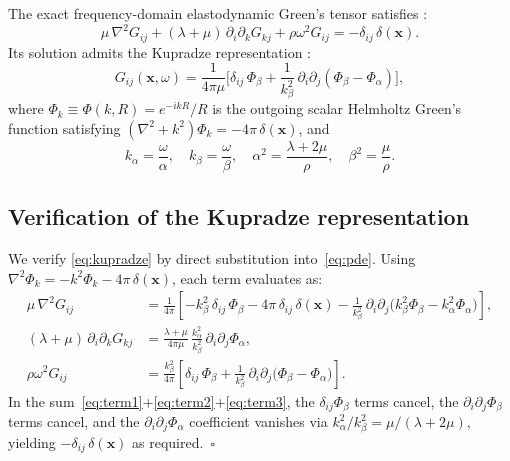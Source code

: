 \documentclass[11pt,a4paper]{article}
\newcommand{\bx}{\mathbf{x}}
\begin{document}
The exact frequency-domain elastodynamic Green's tensor satisfies
\citep{AkiRichards2002,BenMenahemSingh1981}:
\begin{equation}
  \mu\,\nabla^2 G_{ij}
  + (\lambda + \mu)\,\partial_i\partial_k G_{kj}
  + \rho\omega^2 G_{ij}
  = -\delta_{ij}\,\delta(\bx).
  \label{eq:pde}
\end{equation}
Its solution admits the Kupradze representation
\citep{Kupradze1963}:
\begin{equation}
  \boxed{
  G_{ij}(\bx,\omega)
  = \frac{1}{4\pi\mu}
    \biggl[
      \delta_{ij}\,\Phi_\beta
      + \frac{1}{k_\beta^2}\,
        \partial_i\partial_j\!\left(\Phi_\beta - \Phi_\alpha\right)
    \biggr],
  }
  \label{eq:kupradze}
\end{equation}
where
$\Phi_k \equiv \Phi(k,R) = e^{-ikR}/R$
is the outgoing scalar Helmholtz Green's function satisfying
$(\nabla^2 + k^2)\Phi_k = -4\pi\,\delta(\bx)$, and
\begin{equation}
  k_\alpha = \frac{\omega}{\alpha}, \quad
  k_\beta = \frac{\omega}{\beta}, \quad
  \alpha^2 = \frac{\lambda + 2\mu}{\rho}, \quad
  \beta^2 = \frac{\mu}{\rho}.
  \label{eq:wavenumbers}
\end{equation}

\subsection{Verification of the Kupradze representation}

We verify \eqref{eq:kupradze} by direct substitution into~\eqref{eq:pde}.
Using $\nabla^2\Phi_k = -k^2\Phi_k - 4\pi\,\delta(\bx)$, each term evaluates as:
\begin{align}
  \mu\,\nabla^2 G_{ij}
  &= \frac{1}{4\pi}\!\left[
       -k_\beta^2\,\delta_{ij}\,\Phi_\beta - 4\pi\,\delta_{ij}\,\delta(\bx)
       - \frac{1}{k_\beta^2}\,\partial_i\partial_j
         \bigl(k_\beta^2\Phi_\beta - k_\alpha^2\Phi_\alpha\bigr)
     \right], \label{eq:term1} \\[4pt]
  (\lambda\!+\!\mu)\,\partial_i\partial_k G_{kj}
  &= \frac{\lambda\!+\!\mu}{4\pi\mu}\,
     \frac{k_\alpha^2}{k_\beta^2}\,\partial_i\partial_j\Phi_\alpha,
     \label{eq:term2} \\[4pt]
  \rho\omega^2 G_{ij}
  &= \frac{k_\beta^2}{4\pi}\!\left[
       \delta_{ij}\,\Phi_\beta
       + \frac{1}{k_\beta^2}\,\partial_i\partial_j
         \bigl(\Phi_\beta - \Phi_\alpha\bigr)
     \right]. \label{eq:term3}
\end{align}
In the sum~\eqref{eq:term1}+\eqref{eq:term2}+\eqref{eq:term3}, the
$\delta_{ij}\Phi_\beta$ terms cancel, the $\partial_i\partial_j\Phi_\beta$
terms cancel, and the $\partial_i\partial_j\Phi_\alpha$ coefficient
vanishes via
$k_\alpha^2/k_\beta^2 = \mu/(\lambda+2\mu)$, yielding
$-\delta_{ij}\,\delta(\bx)$ as required.~$\square$
\end{document}
